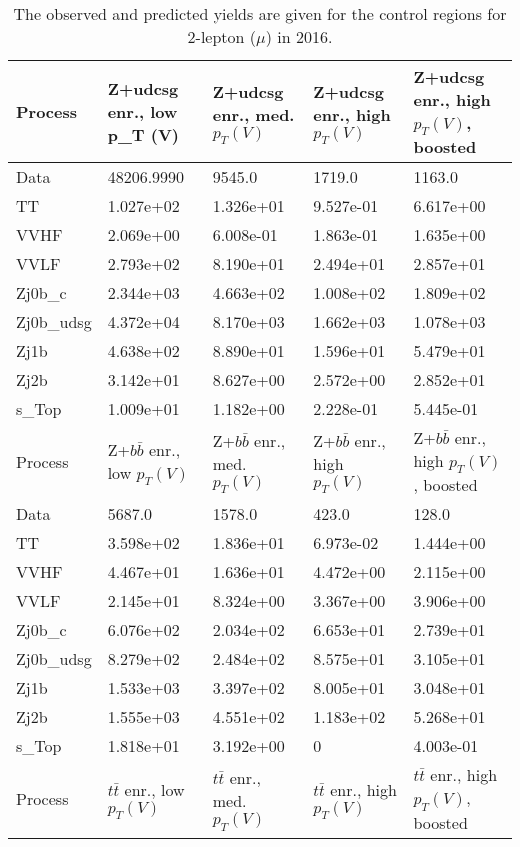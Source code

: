 \begin{table}
\centering
\caption[2016 2-lepton ($\mu$) control region yields]{
                  The observed and predicted yields are given for the
                  control regions for 2-lepton ($\mu$) in 2016.
                  }
{\footnotesize
\begin{tabularx}{\textwidth}{|X|X|X|X|X|}
\hline
Process & Z+udcsg enr., low p_{T} (V) & Z+udcsg enr., med. $p_{T}(V)$ & Z+udcsg enr., high $p_{T}(V)$ & Z+udcsg enr., high $p_{T}(V)$, boosted \\
\hline
Data & 48206.9990 & 9545.0 & 1719.0 & 1163.0 \\
\hline
TT & 1.027e+02 & 1.326e+01 & 9.527e-01 & 6.617e+00 \\
VVHF & 2.069e+00 & 6.008e-01 & 1.863e-01 & 1.635e+00 \\
VVLF & 2.793e+02 & 8.190e+01 & 2.494e+01 & 2.857e+01 \\
Zj0b\_c & 2.344e+03 & 4.663e+02 & 1.008e+02 & 1.809e+02 \\
Zj0b\_udsg & 4.372e+04 & 8.170e+03 & 1.662e+03 & 1.078e+03 \\
Zj1b & 4.638e+02 & 8.890e+01 & 1.596e+01 & 5.479e+01 \\
Zj2b & 3.142e+01 & 8.627e+00 & 2.572e+00 & 2.852e+01 \\
s\_Top & 1.009e+01 & 1.182e+00 & 2.228e-01 & 5.445e-01 \\
\hline
\hline
Process & Z+$b\bar{b}$ enr., low $p_{T}(V)$ & Z+$b\bar{b}$ enr., med. $p_{T}(V)$ & Z+$b\bar{b}$ enr., high $p_{T}(V)$ & Z+$b\bar{b}$ enr., high $p_{T}(V)$, boosted \\
\hline
Data & 5687.0 & 1578.0 & 423.0 & 128.0 \\
\hline
TT & 3.598e+02 & 1.836e+01 & 6.973e-02 & 1.444e+00 \\
VVHF & 4.467e+01 & 1.636e+01 & 4.472e+00 & 2.115e+00 \\
VVLF & 2.145e+01 & 8.324e+00 & 3.367e+00 & 3.906e+00 \\
Zj0b\_c & 6.076e+02 & 2.034e+02 & 6.653e+01 & 2.739e+01 \\
Zj0b\_udsg & 8.279e+02 & 2.484e+02 & 8.575e+01 & 3.105e+01 \\
Zj1b & 1.533e+03 & 3.397e+02 & 8.005e+01 & 3.048e+01 \\
Zj2b & 1.555e+03 & 4.551e+02 & 1.183e+02 & 5.268e+01 \\
s\_Top & 1.818e+01 & 3.192e+00 & 0 & 4.003e-01 \\
\hline
\hline
Process & $t\bar{t}$ enr., low $p_{T}(V)$ & $t\bar{t}$ enr., med. $p_{T}(V)$ & $t\bar{t}$ enr., high $p_{T}(V)$ & $t\bar{t}$ enr., high $p_{T}(V)$, boosted \\

\end{tabularx}}
\end{table}
